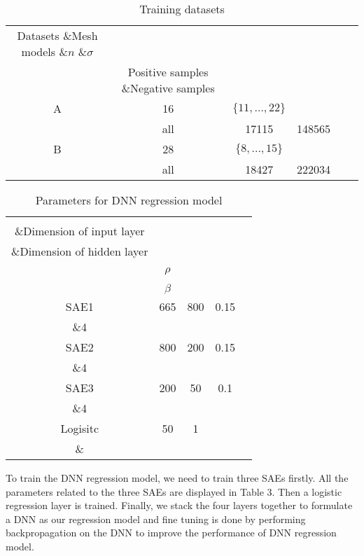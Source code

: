\documentclass[runningheads]{article}
\begin{document}
\begin{table}[tbp]
	\centering
	\renewcommand\arraystretch{1.2}
	\caption{Training datasets}
	\begin{tabular}{cccccc}
		\hline
		\cline{1-6}
		Datasets \&Mesh models \&\emph{$n$} \&\emph{$\sigma$} \\ &Positive samples \&Negative samples \\ \hline
		A &16 &\emph{$\{11,...,22\}$} \\ &all &17115 &148565\\
		B &28 &\emph{$\{8,...,15\}$} \\&all &18427 &222034\\
		\hline
		\cline{1-6}
	\end{tabular}
\end{table}
\begin{table}[tbp]
	\centering
	\renewcommand\arraystretch{1.2}
	\caption{Parameters for DNN regression model}
	\begin{tabular}{ccccc}
		\hline
		\cline{1-5}
		\\\&Dimension of input layer \\\&Dimension of hidden layer \\\\&\emph{$\rho$} \\\\ &\emph{$\beta$} \\ \hline
		SAE1 &665 &800 &0.15 \\\&4 \\
		SAE2 &800 &200 &0.15 \\\&4 \\
		SAE3 &200 &50 &0.1 \\\&4 \\
		Logisitc &50 &1 & \\\& \\
		\hline
		\cline{1-5}
	\end{tabular}
\end{table}

To train the DNN regression model, we need to train three SAEs firstly. All the parameters related to the three SAEs are displayed in Table 3. Then a logistic regression layer is trained. Finally, we stack the four layers together to formulate a DNN as our regression model and fine tuning is done by performing backpropagation on the DNN to improve the performance of DNN regression model.
\end{document}
